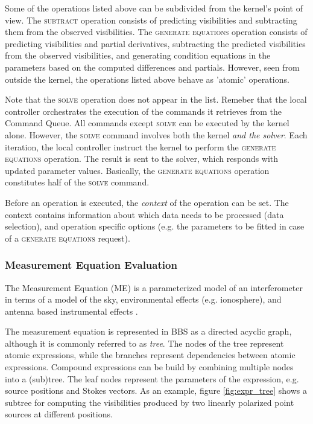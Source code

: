 \documentclass[10pt]{lofar}
\newcommand{\subtract}{\textsc{subtract}\xspace}
\newcommand{\solve}{\textsc{solve}\xspace}
\newcommand{\generate}{\textsc{generate equations}\xspace}
\begin{document}
Some of the operations listed above can be subdivided from the kernel's point of
view. The \subtract operation consists of predicting visibilities and
subtracting them from the observed visibilities. The \generate operation
consists of predicting visibilities and partial derivatives, subtracting the
predicted visibilities from the observed visibilities, and generating condition
equations in the parameters based on the computed differences and partials.
However, seen from outside the kernel, the operations listed above behave as
'atomic' operations.

Note that the \solve operation does not appear in the list. Remeber that the
local controller orchestrates the execution of the commands it retrieves from
the Command Queue. All commands except \solve can be executed by the kernel
alone. However, the \solve command involves both the kernel \emph{and the
solver}. Each iteration, the local controller instruct the kernel to perform the
\generate operation. The result is sent to the solver, which responds with
updated parameter values. Basically, the \generate operation constitutes half of
the \solve command.

Before an operation is executed, the \emph{context} of the operation can be set.
The context contains information about which data needs to be processed (data
selection), and operation specific options (e.g. the parameters to be fitted in
case of a \generate request).

\subsubsection{Measurement Equation Evaluation}
\label{subsubsec:design-me-evaluation}

The Measurement Equation (ME) \cite{LOFAR-ASTRON-ADD-015} is a parameterized
model of an interferometer in terms of a model of the sky, environmental effects
(e.g. ionosphere), and antenna based instrumental effects \cite{Hamaker1996-1,
aips++note185}.

The measurement equation is represented in BBS as a directed acyclic graph,
although it is commonly referred to as \emph{tree}. The nodes of the tree
represent atomic expressions, while the branches represent dependencies between
atomic expressions. Compound expressions can be build by combining multiple
nodes into a (sub)tree. The leaf nodes represent the parameters of the
expression, e.g. source positions and Stokes vectors. As an example, figure
\ref{fig:expr_tree} shows a subtree for computing the visibilities produced by
two linearly polarized point sources at different positions.
\end{document}
